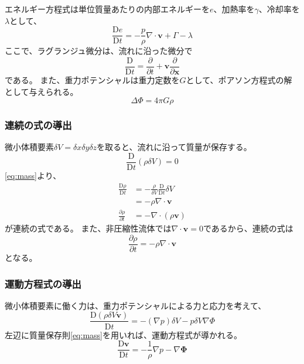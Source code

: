 \documentclass{jsarticle}
\newcommand{\bx}{\mathbf{x}}
\newcommand{\bv}{\mathbf{v}}
\newcommand{\pder}[2][]{\frac{\partial#1}{\partial#2}}
\newcommand{\Dder}[2][]{\frac{\mathrm{D}#1}{\mathrm{D}#2}}
\newcommand{\beq}{\begin{equation}}
\newcommand{\eeq}{\end{equation}}
\begin{document}
エネルギー方程式は単位質量あたりの内部エネルギーを$e$、加熱率を$\gamma$、冷却率を$\lambda$として、
\begin{equation}
    \Dder[e]{t} = - \frac{p}{\rho} \nabla \cdot \bv + \Gamma - \lambda
\end{equation}
ここで、ラグランジュ微分は、流れに沿った微分で
\begin{equation}
    \Dder[]{t} = \pder[]{t} + \bv\pder[]{\bx}
\end{equation}
である。
また、重力ポテンシャルは重力定数を$G$として、ポアソン方程式の解として与えられる。
\beq
 \Delta \Phi = 4 \pi G \rho
\eeq
\subsubsection{連続の式の導出}
微小体積要素$\delta V = \delta x \delta y \delta z$を取ると、流れに沿って質量が保存する。
\begin{equation}
    \Dder[]{t} (\rho\delta V)= 0\label{eq:mass}
\end{equation}
\eqref{eq:mass}より、
\begin{align}
    \Dder[\rho]{t} &= -\frac{\rho}{\delta V}\Dder[]{t} \delta V \\
     &= - \rho \nabla \cdot \bv\\
    \pder[\rho]{t} &= -  \nabla \cdot (\rho\bv)\label{eq:continuous}
\end{align}
\label{eq:continuous}が連続の式である。
また、非圧縮性流体では$\nabla \cdot \bv = 0$であるから、連続の式は
\begin{equation}
    \pder[\rho]{t} = -  \rho \nabla \cdot \bv
\end{equation}
となる。
\subsubsection{運動方程式の導出}
微小体積要素に働く力は、重力ポテンシャルによる力と応力を考えて、
\begin{equation}
     \Dder[(\rho \delta V \bv)]{t} = - (\nabla p) \delta V - p \delta V \nabla \Phi
\end{equation}
左辺に質量保存則\eqref{eq:mass}を用いれば、運動方程式が導かれる。
\begin{equation}
    \Dder[\bv]{t} = - \frac{1}{\rho}\nabla p - \nabla\mathbf{\Phi}
\end{equation}
\end{document}
